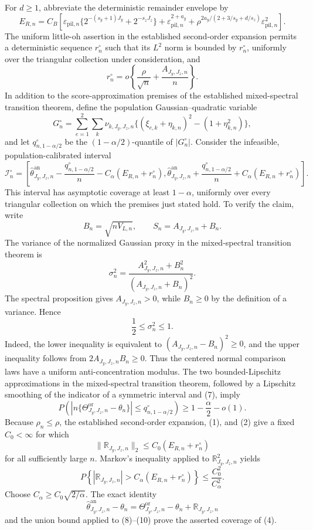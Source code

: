 For \(d\ge1\), abbreviate the deterministic remainder envelope by
\[
E_{R,n}=C_B\left[
\varepsilon_{\mathrm{pil},n}\{2^{-(s_y+1)J_y}+2^{-s_zJ_z}\}
+\varepsilon_{\mathrm{pil},n}^{2+a_y}
+\rho^{2a_y/(2+3/s_y+d/s_z)}\varepsilon_{\mathrm{pil},n}^2
\right].                                                     \tag{1}
\]
The uniform little-oh assertion in the established second-order expansion permits a deterministic sequence \(r_n^\circ\) such that its \(L^2\) norm is bounded by \(r_n^\circ\), uniformly over the triangular collection under consideration, and
\[
r_n^\circ=o\!\left\{\frac{\rho}{\sqrt n}+\frac{A_{J_y,J_z,n}}n\right\}. \tag{2}
\]
In addition to the score-approximation premises of the established mixed-spectral transition theorem, define the population Gaussian--quadratic variable
\[
G_n^\circ=\sum_{e=1}^2\sum_k\nu_{k,J_y,J_z,n}
\{(\xi_{e,k}+\eta_{k,n})^2-(1+\eta_{k,n}^2)\},               \tag{3}
\]
and let \(q_{n,1-\alpha/2}^\circ\) be the \((1-\alpha/2)\)-quantile of \(|G_n^\circ|\).  Consider the infeasible, population-calibrated interval
\[
\mathcal I_n^\circ=
\left[
\widehat\theta^{\mathrm{an}}_{J_y,J_z,n}
-\frac{q_{n,1-\alpha/2}^\circ}{n}-C_\alpha(E_{R,n}+r_n^\circ),
\widehat\theta^{\mathrm{an}}_{J_y,J_z,n}
+\frac{q_{n,1-\alpha/2}^\circ}{n}+C_\alpha(E_{R,n}+r_n^\circ)
\right].                                                       \tag{4}
\]
This interval has asymptotic coverage at least \(1-\alpha\), uniformly over every triangular collection on which the premises just stated hold.  To verify the claim, write
\[
B_n=\sqrt{nV_{L,n}},
\qquad S_n=A_{J_y,J_z,n}+B_n.                                  \tag{5}
\]
The variance of the normalized Gaussian proxy in the mixed-spectral transition theorem is
\[
\sigma_n^2=\frac{A_{J_y,J_z,n}^2+B_n^2}
{(A_{J_y,J_z,n}+B_n)^2}.                                      \tag{6}
\]
The spectral proposition gives \(A_{J_y,J_z,n}>0\), while \(B_n\ge0\) by the definition of a variance.  Hence
\[
\frac12\le\sigma_n^2\le1.                                   \tag{7}
\]
Indeed, the lower inequality is equivalent to \((A_{J_y,J_z,n}-B_n)^2\ge0\), and the upper inequality follows from \(2A_{J_y,J_z,n}B_n\ge0\).  Thus the centered normal comparison laws have a uniform anti-concentration modulus.  The two bounded-Lipschitz approximations in the mixed-spectral transition theorem, followed by a Lipschitz smoothing of the indicator of a symmetric interval and (7), imply
\[
P\!\left(
\left|n\{\Theta^{\mathrm{or}}_{J_y,J_z,n}-\theta_n\}\right|
\le q_{n,1-\alpha/2}^\circ
\right)\ge1-\frac\alpha2-o(1).                                \tag{8}
\]
Because \(\rho_n\le\rho\), the established second-order expansion, (1), and (2) give a fixed \(C_0<\infty\) for which
\[
\|\mathbb R_{J_y,J_z,n}\|_2\le C_0(E_{R,n}+r_n^\circ)        \tag{9}
\]
for all sufficiently large \(n\).  Markov's inequality applied to \(\mathbb R_{J_y,J_z,n}^2\) yields
\[
P\!\left\{
|\mathbb R_{J_y,J_z,n}|>C_\alpha(E_{R,n}+r_n^\circ)
\right\}\le\frac{C_0^2}{C_\alpha^2}.                         \tag{10}
\]
Choose \(C_\alpha\ge C_0\sqrt{2/\alpha}\).  The exact identity
\[
\widehat\theta^{\mathrm{an}}_{J_y,J_z,n}-\theta_n
=\Theta^{\mathrm{or}}_{J_y,J_z,n}-\theta_n
+\mathbb R_{J_y,J_z,n}                                      \tag{11}
\]
and the union bound applied to (8)--(10) prove the asserted coverage of (4).

